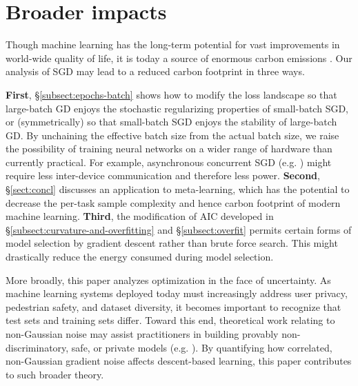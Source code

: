 \documentclass{article}
\theoremstyle{plain}
\theoremstyle{definition}
\begin{document}

\section*{Broader impacts}

    Though machine learning has the long-term potential for vast improvements
    in world-wide quality of life, it is today a source of enormous carbon
    emissions \citep{st19}.  Our analysis of SGD may lead to a reduced carbon
    footprint in three ways. 
     
    \textbf{First}, \S\ref{subsect:epochs-batch} shows how to modify the loss
    landscape so that large-batch GD enjoys the stochastic regularizing
    properties of small-batch SGD, or (symmetrically) so that small-batch SGD
    enjoys the stability of large-batch GD.  By unchaining the effective batch
    size from the actual batch size, we raise the possibility of training
    neural networks on a wider range of hardware than currently practical.  For
    example, asynchronous concurrent SGD (e.g. \cite{ni11}) might
    require less inter-device communication and therefore less power.
    \textbf{Second}, \S\ref{sect:concl} discusses an application to meta-learning,
    which has the potential to decrease the per-task sample complexity and
    hence carbon footprint of modern machine learning.
    \textbf{Third}, the modification of AIC developed in
    \S\ref{subsect:curvature-and-overfitting} and \S\ref{subsect:overfit}
    permits certain forms of model selection by gradient descent rather than
    brute force search.  This might drastically reduce the energy consumed
    during model selection.

    More broadly, this paper analyzes optimization in the face of uncertainty.
    As machine learning systems deployed today must increasingly address user
    privacy, pedestrian safety, and dataset diversity, it becomes important to
    recognize that test sets and training sets differ.  Toward this end,
    theoretical work relating to non-Gaussian noise may assist practitioners in
    building provably non-discriminatory, safe, or private models (e.g.
    \cite{dw06}).  By quantifying how correlated, non-Gaussian gradient noise
    affects descent-based learning, this paper contributes to such broader
    theory.
\end{document}

